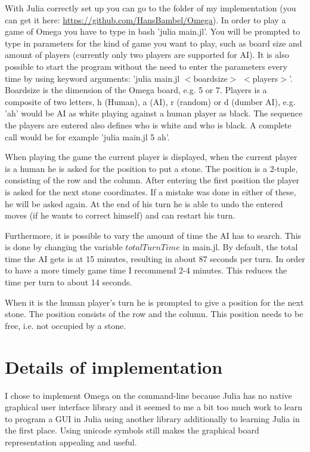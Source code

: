 \documentclass[a4paper]{article}
\begin{document}
With Julia correctly set up you can go to the folder of my implementation (you can get it here: \url{https://github.com/HansBambel/Omega}). In order to play a game of Omega you have to type in bash 'julia main.jl'. You will be prompted to type in parameters for the kind of game you want to play, such as board size and amount of players (currently only two players are supported for AI). It is also possible to start the program without the need to enter the parameters every time by using keyword arguments: 'julia main.jl $<$boardsize$>$ $<$players$>$'. Boardsize is the dimension of the Omega board, e.g. 5 or 7. Players is a composite of two letters, h (Human), a (AI), r (random) or d (dumber AI), e.g. 'ah' would be AI as white playing against a human player as black. The sequence the players are entered also defines who is white and who is black. A complete call would be for example 'julia main.jl 5 ah'.

When playing the game the current player is displayed, when the current player is a human he is asked for the position to put a stone. The position is a 2-tuple, consisting of the row and the column. After entering the first position the player is asked for the next stone coordinates. If a mistake was done in either of these, he will be asked again. At the end of his turn he is able to undo the entered moves (if he wants to correct himself) and can restart his turn.

Furthermore, it is possible to vary the amount of time the AI has to search. This is done by changing the variable $totalTurnTime$ in main.jl. By default, the total time the AI gets is at 15 minutes, resulting in about 87 seconds per turn. In order to have a more timely game time I recommend 2-4 minutes. This reduces the time per turn to about 14 seconds.

When it is the human player's turn he is prompted to give a position for the next stone. The position consists of the row and the column. This position needs to be free, i.e. not occupied by a stone.

\section{Details of implementation}
I chose to implement Omega on the command-line because Julia has no native graphical user interface library and it seemed to me a bit too much work to learn to program a GUI in Julia using another library additionally to learning Julia in the first place. Using unicode symbols still makes the graphical board representation appealing and useful.
\end{document}
